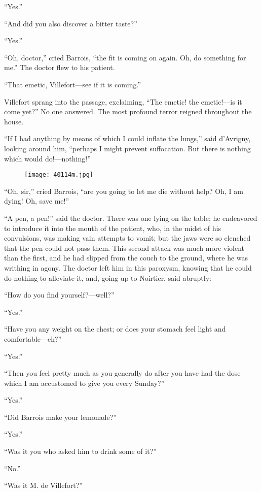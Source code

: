 “Yes.”

“And did you also discover a bitter taste?”

“Yes.”

“Oh, doctor,” cried Barrois, “the fit is coming on again. Oh, do
something for me.” The doctor flew to his patient.

“That emetic, Villefort—see if it is coming.”

Villefort sprang into the passage, exclaiming, “The emetic! the
emetic!—is it come yet?” No one answered. The most profound terror
reigned throughout the house.

“If I had anything by means of which I could inflate the lungs,” said
d’Avrigny, looking around him, “perhaps I might prevent suffocation.
But there is nothing which would do!—nothing!”

\begin{figure}[ht]
\texttt{[image: 40114m.jpg]}
\end{figure}

“Oh, sir,” cried Barrois, “are you going to let me die without help?
Oh, I am dying! Oh, save me!”

“A pen, a pen!” said the doctor. There was one lying on the table; he
endeavored to introduce it into the mouth of the patient, who, in the
midst of his convulsions, was making vain attempts to vomit; but the
jaws were so clenched that the pen could not pass them. This second
attack was much more violent than the first, and he had slipped from
the couch to the ground, where he was writhing in agony. The doctor
left him in this paroxysm, knowing that he could do nothing to
alleviate it, and, going up to Noirtier, said abruptly:

“How do you find yourself?—well?”

“Yes.”

“Have you any weight on the chest; or does your stomach feel light and
comfortable—eh?”

“Yes.”

“Then you feel pretty much as you generally do after you have had the
dose which I am accustomed to give you every Sunday?”

“Yes.”

“Did Barrois make your lemonade?”

“Yes.”

“Was it you who asked him to drink some of it?”

“No.”

“Was it M. de Villefort?”

